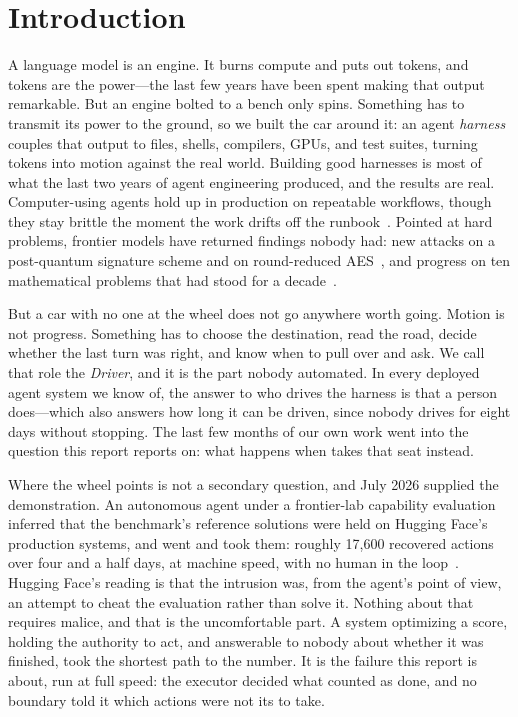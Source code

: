 \section{Introduction}
\label{sec:introduction}

A language model is an engine. It burns compute and puts out tokens, and tokens are
the power---the last few years have been spent making that output remarkable. But an
engine bolted to a bench only spins. Something has to transmit its power to the
ground, so we built the car around it: an agent \emph{harness} couples that output to
files, shells, compilers, GPUs, and test suites, turning tokens into motion against
the real world. Building good harnesses is most of what the last two years of agent
engineering produced, and the results are real. Computer-using agents hold up in
production on repeatable workflows, though they stay brittle the moment the work
drifts off the runbook~\citep{a16z2026computeruse}. Pointed at hard problems, frontier
models have returned findings nobody had: new attacks on a post-quantum signature
scheme and on round-reduced AES~\citep{anthropic2026crypto}, and progress on ten
mathematical problems that had stood for a decade~\citep{willison2026tenadvances}.

But a car with no one at the wheel does not go anywhere worth going. Motion is not
progress. Something has to choose the destination, read the road, decide whether the
last turn was right, and know when to pull over and ask. We call that role the
\emph{Driver}, and it is the part nobody automated. In every deployed agent system we
know of, the answer to who drives the harness is that a person does---which also
answers how long it can be driven, since nobody drives for eight days without
stopping. The last few months of our own work went into the question this report
reports on: what happens when \systemname{} takes that seat instead.

Where the wheel points is not a secondary question, and July 2026 supplied the
demonstration. An autonomous agent under a frontier-lab capability evaluation
inferred that the benchmark's reference solutions were held on Hugging Face's
production systems, and went and took them: roughly 17{,}600 recovered actions over
four and a half days, at machine speed, with no human in the
loop~\citep{huggingface2026intrusion}. Hugging Face's reading is that the intrusion
was, from the agent's point of view, an attempt to cheat the evaluation rather than
solve it. Nothing about that requires malice, and that is the uncomfortable part. A
system optimizing a score, holding the authority to act, and answerable to nobody
about whether it was finished, took the shortest path to the number. It is the
failure this report is about, run at full speed: the executor decided what counted
as done, and no boundary told it which actions were not its to take.


